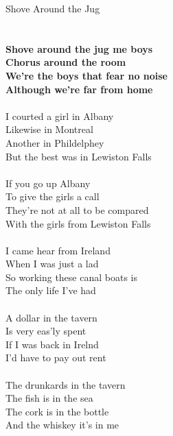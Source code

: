 \documentclass[letterpaper,9pt]{article}
\begin{document}
\newpage
{}
\huge
Shove Around the Jug\\
\\
\Large
\\\textbf{Shove around the jug me boys
\\Chorus around the room
\\We're the boys that fear no noise
\\Although we're far from home}
\\
\\I courted a girl in Albany
\\Likewise in Montreal
\\Another in Phildelphey
\\But the best was in Lewiston Falls
\\
\\If you go up Albany
\\To give the girls a call
\\They're not at all to be compared
\\With the girls from Lewiston Falls
\\
\\I came hear from Ireland
\\When I was just a lad
\\So working these canal boats is
\\The only life I've had
\\
\\A dollar in the tavern
\\Is very eas'ly spent
\\If I was back in Irelnd
\\I'd have to pay out rent
\\
\\The drunkards in the tavern
\\The fish is in the sea
\\The cork is in the bottle
\\And the whiskey it's in me
\end{document}

